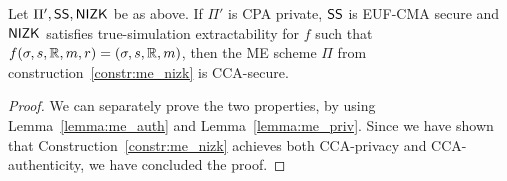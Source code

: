 \begin{theorem}\label{theo:me_nizk}
    Let $\Pi', \mathsf{SS}, \mathsf{NIZK}$ be as above.
    If $\Pi'$ is CPA private, $\mathsf{SS}$ is EUF-CMA secure and $\mathsf{NIZK}$ satisfies true-simulation extractability for $f$ such that $f(\sigma, s, \mathbb{R}, m, r) = (\sigma, s, \mathbb{R}, m)$, then the ME scheme $\Pi$ from construction~\ref{constr:me_nizk} is CCA-secure.
\end{theorem}

\begin{proof}
    We can separately prove the two properties, by using Lemma~\ref{lemma:me_auth} and Lemma~\ref{lemma:me_priv}.
    Since we have shown that Construction~\ref{constr:me_nizk} achieves both CCA-privacy and CCA-authenticity, we have concluded the proof.
\end{proof}